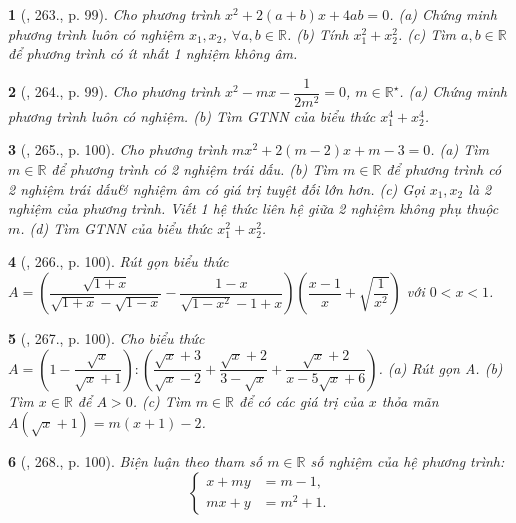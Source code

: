 \documentclass{article}
\newtheorem{baitoan}{}
\begin{document}
\begin{baitoan}[\cite{Tuyen_Toan_9_old}, 263., p. 99]
	Cho phương trình $x^2 + 2(a + b)x + 4ab = 0$. (a) Chứng minh phương trình luôn có nghiệm $x_1,x_2$, $\forall a,b\in\mathbb{R}$. (b) Tính $x_1^2 + x_2^2$. (c) Tìm $a,b\in\mathbb{R}$ để phương trình có ít nhất 1 nghiệm không âm.
\end{baitoan}

\begin{baitoan}[\cite{Tuyen_Toan_9_old}, 264., p. 99]
	Cho phương trình $x^2 - mx - \dfrac{1}{2m^2} = 0$, $m\in\mathbb{R}^\star$. (a) Chứng minh phương trình luôn có nghiệm. (b) Tìm {\rm GTNN} của biểu thức $x_1^4 + x_2^4$.
\end{baitoan}

\begin{baitoan}[\cite{Tuyen_Toan_9_old}, 265., p. 100]
	Cho phương trình $mx^2 + 2(m - 2)x + m - 3 = 0$. (a) Tìm $m\in\mathbb{R}$ để phương trình có 2 nghiệm trái dấu. (b) Tìm $m\in\mathbb{R}$ để phương trình có 2 nghiệm trái dấu\& nghiệm âm có giá trị tuyệt đối lớn hơn. (c) Gọi $x_1,x_2$ là 2 nghiệm của phương trình. Viết 1 hệ thức liên hệ giữa 2 nghiệm không phụ thuộc $m$. (d) Tìm {\rm GTNN} của biểu thức $x_1^2 + x_2^2$.
\end{baitoan}

\begin{baitoan}[\cite{Tuyen_Toan_9_old}, 266., p. 100]
	Rút gọn biểu thức $A = \left(\dfrac{\sqrt{1 + x}}{\sqrt{1 + x} - \sqrt{1 - x}} - \dfrac{1 - x}{\sqrt{1 - x^2} - 1 + x}\right)$$\left(\dfrac{x - 1}{x} + \sqrt{\dfrac{1}{x^2}}\right)$ với $0 < x < 1$.
\end{baitoan}

\begin{baitoan}[\cite{Tuyen_Toan_9_old}, 267., p. 100]
	Cho biểu thức $A = \left(1 - \dfrac{\sqrt{x}}{\sqrt{x} + 1}\right):\left(\dfrac{\sqrt{x} + 3}{\sqrt{x} - 2} + \dfrac{\sqrt{x} + 2}{3 - \sqrt{x}} + \dfrac{\sqrt{x} + 2}{x - 5\sqrt{x} + 6}\right)$. (a) Rút gọn A. (b) Tìm $x\in\mathbb{R}$ để $A > 0$. (c) Tìm $m\in\mathbb{R}$ để có các giá trị của $x$ thỏa mãn $A(\sqrt{x} + 1) = m(x + 1) - 2$.
\end{baitoan}

\begin{baitoan}[\cite{Tuyen_Toan_9_old}, 268., p. 100]
	Biện luận theo tham số $m\in\mathbb{R}$ số nghiệm của hệ phương trình:
	\begin{equation*}
		\left\{\begin{split}
			x + my &= m - 1,\\
			mx + y &= m^2 + 1.
		\end{split}\right.
	\end{equation*}
\end{baitoan}
\end{document}
